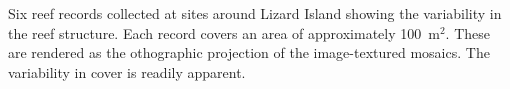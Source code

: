 \label{fig:reef_record_example}Six reef records collected at sites around Lizard Island showing the variability in the reef structure.  Each record covers an area of approximately 100~m$^2$.  These are rendered as the othographic projection of the image-textured mosaics. The variability in cover is readily apparent.